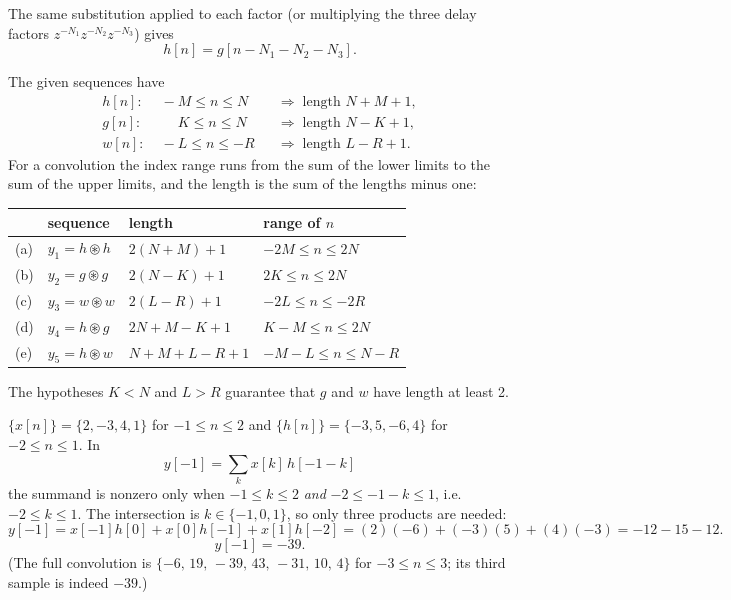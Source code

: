 
The same substitution applied to each factor (or multiplying the three delay factors
$z^{-N_1}z^{-N_2}z^{-N_3}$) gives
\[
\boxed{\;h[n]=g[n-N_1-N_2-N_3].\;}
\]


The given sequences have
\[
\begin{aligned}
h[n]:&\;-M\le n\le N &&\Rightarrow\; \text{length } N+M+1,\\
g[n]:&\;\phantom{-}K\le n\le N &&\Rightarrow\; \text{length } N-K+1,\\
w[n]:&\;-L\le n\le -R &&\Rightarrow\; \text{length } L-R+1 .
\end{aligned}
\]
For a convolution the index range runs from the sum of the lower limits to the sum of the
upper limits, and the length is the sum of the lengths minus one:

\begin{center}
\renewcommand{\arraystretch}{1.3}
\begin{tabular}{@{}llll@{}}
\toprule
& sequence & length & range of $n$\\
\midrule
(a) & $y_1=h\circledast h$ & $2(N+M)+1$ & $-2M\le n\le 2N$\\
(b) & $y_2=g\circledast g$ & $2(N-K)+1$ & $2K\le n\le 2N$\\
(c) & $y_3=w\circledast w$ & $2(L-R)+1$ & $-2L\le n\le -2R$\\
(d) & $y_4=h\circledast g$ & $2N+M-K+1$ & $K-M\le n\le 2N$\\
(e) & $y_5=h\circledast w$ & $N+M+L-R+1$ & $-M-L\le n\le N-R$\\
\bottomrule
\end{tabular}
\end{center}
The hypotheses $K<N$ and $L>R$ guarantee that $g$ and $w$ have length at least 2.


$\{x[n]\}=\{2,-3,4,1\}$ for $-1\le n\le 2$ and $\{h[n]\}=\{-3,5,-6,4\}$ for $-2\le n\le 1$.
In
\[
y[-1]=\sum_k x[k]\,h[-1-k]
\]
the summand is nonzero only when $-1\le k\le 2$ \emph{and} $-2\le -1-k\le 1$, i.e.\
$-2\le k\le 1$. The intersection is $k\in\{-1,0,1\}$, so only three products are needed:
\[
y[-1]=x[-1]h[0]+x[0]h[-1]+x[1]h[-2]=(2)(-6)+(-3)(5)+(4)(-3)=-12-15-12 .
\]
\[
\boxed{\;y[-1]=-39.\;}
\]
(The full convolution is $\{-6,\,19,\,-39,\,43,\,-31,\,10,\,4\}$ for $-3\le n\le 3$; its third
sample is indeed $-39$.)

